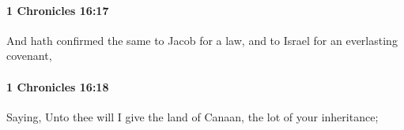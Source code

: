		\paragraph{1 Chronicles 16:17} %
			\label{1CHRONICLES-16-17}

			And hath confirmed the same to Jacob for a law, and to Israel for an everlasting covenant,


		\paragraph{1 Chronicles 16:18} %
			\label{1CHRONICLES-16-18}

			Saying, Unto thee will I give the land of Canaan, the lot of your inheritance;


